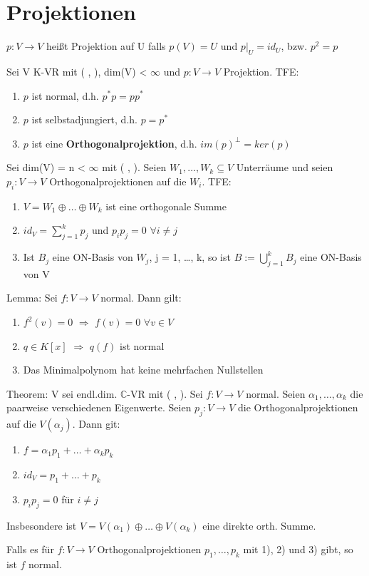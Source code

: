 \section{Projektionen}
$p: V \to V$ heißt Projektion auf U falls $p(V) = U$ und $p|_U = id_U$, bzw. $p^2 = p$
\begin{compactitem}
\item Sei V K-VR mit ( , ), dim(V) < $\infty$ und $p: V \to V$ Projektion. TFE:
\begin{enumerate}
\item $p$ ist normal, d.h. $p^*p = pp^*$
\item $p$ ist selbstadjungiert, d.h. $p = p^*$
\item $p$ ist eine \textbf{Orthogonalprojektion}, d.h. $im(p)^\perp = ker(p)$
\end{enumerate}
\item Sei dim(V) = n < $\infty$ mit ( , ). Seien $W_1, …, W_k \subseteq V$ Unterräume und seien $p_i: V \to V$ Orthogonalprojektionen auf die $W_i$. TFE:
\begin{enumerate}
\item $V = W_1 \oplus … \oplus W_k$ ist eine orthogonale Summe
\item $id_V = \sum\limits_{j=1}^k p_j$ und $p_ip_j = 0$ $\forall i \neq j$
\item Ist $B_j$ eine ON-Basis von $W_j$, j = 1, …, k, so ist $B := \bigcup\limits_{j=1}^k B_j$ eine ON-Basis von V 
\end{enumerate}
\item Lemma: Sei $f: V \to V$ normal. Dann gilt:
\begin{enumerate}
\item $f^2(v) = 0$ $\Rightarrow$ $f(v) = 0$ $\forall v \in V$
\item $q \in K[x]$ $\Rightarrow$ $q(f)$ ist normal
\item Das Minimalpolynom hat keine mehrfachen Nullstellen
\end{enumerate}
\item Theorem: V sei endl.dim. $\mathbb{C}$-VR mit ( , ). Sei $f: V \to V$ normal. Seien $\alpha_1, …, \alpha_k$ die paarweise verschiedenen Eigenwerte. Seien $p_j: V \to V$ die Orthogonalprojektionen auf die $V(\alpha_j)$. Dann git:
\begin{enumerate}
\item $f = \alpha_1p_1 + … + \alpha_kp_k$
\item $id_V = p_1 + … + p_k$
\item $p_ip_j = 0$ für $i \neq j$
\end{enumerate}
Insbesondere ist $V = V(\alpha_1) \oplus … \oplus V(\alpha_k)$ eine direkte orth. Summe.

\begin{remark}
Falls es für $f: V \to V$ Orthogonalprojektionen $p_1, …, p_k$ mit 1), 2) und 3) gibt, so ist $f$ normal.
\end{remark}
\end{compactitem}

